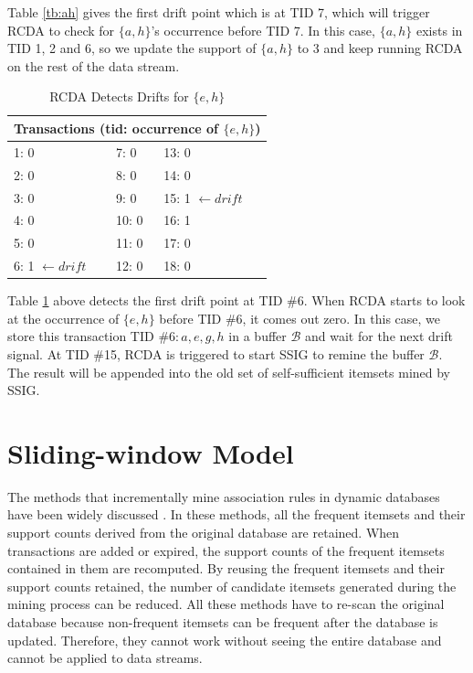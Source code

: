 Table \ref{tb:ah} gives the first drift point which is at TID 7, which will trigger RCDA to check for $\{a, h\}$'s occurrence before TID 7. In this case, $\{a, h\}$ exists in TID 1, 2 and 6, so we update the support of $\{a, h\}$ to 3 and keep running RCDA on the rest of the data stream.

\begin{table}[H]
\caption{RCDA Detects Drifts for $\{e, h\}$}
\label{tb:eh}
\centering
 \begin{tabular}{p{4cm} p{4cm} p{4cm}} 
 \hline\hline
 \multicolumn{3}{c}{Transactions (tid: occurrence of $\{e, h\}$)}\\
 \hline
 1: 0 & 7: 0 & 13: 0\\ 
 2: 0 & 8: 0 & 14: 0\\
 3: 0 & 9: 0 & 15: 1 $\leftarrow drift$ \\
 4: 0 & 10: 0 & 16: 1\\
 5: 0 & 11: 0 & 17: 0\\
 6: 1 $\leftarrow drift$ & 12: 0 & 18: 0\\
 \hline
\end{tabular}
\end{table}

Table \ref{tb:eh} above detects the first drift point at TID \#6. When RCDA starts to look at the occurrence of $\{e, h\}$ before TID \#6, it comes out zero. In this case, we store this transaction TID \#$6: a, e, g, h$ in a buffer $\mathcal{B}$ and wait for the next drift signal. At TID \#15, RCDA is triggered to start SSIG to remine the buffer $\mathcal{B}$. The result will be appended into the old set of self-sufficient itemsets mined by SSIG.

\section{Sliding-window Model}

The methods that incrementally mine association rules in dynamic databases have been widely discussed \cite{SWF,window,inc}. In these methods, all the frequent itemsets and their support counts derived from the original database are retained. When transactions are added or expired, the support counts of the frequent itemsets contained in
them are recomputed. By reusing the frequent itemsets and their support counts retained, the number of candidate itemsets generated during the mining process can be reduced. All these methods have to re-scan the original database because non-frequent itemsets can be
frequent after the database is updated. Therefore, they cannot work without seeing the entire database and cannot be applied to data streams.  

